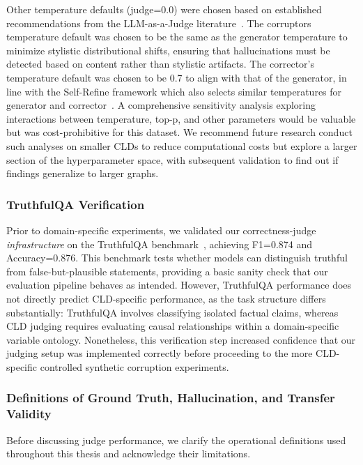 Other temperature defaults (judge=0.0) were chosen based on established recommendations from the LLM-as-a-Judge literature~\citep{liu2023gevalnlgevaluationusing, zheng2024judging}.
The corruptors temperature default was chosen to be the same as the generator temperature to minimize stylistic distributional shifts, ensuring that hallucinations must be detected based on content rather than stylistic artifacts.
The corrector's temperature default was chosen to be 0.7 to align with that of the generator, in line with the Self-Refine framework which also selects similar temperatures for generator and corrector~\citep{madaan2023selfrefineiterativerefinementselffeedback}.
A comprehensive sensitivity analysis exploring interactions between temperature, top-p, and other parameters would be valuable but was cost-prohibitive for this dataset. We recommend future research conduct such analyses on smaller CLDs to reduce computational costs but explore a larger section of the hyperparameter space, with subsequent validation to find out if findings generalize to larger graphs.

\subsubsection{TruthfulQA Verification}

Prior to domain-specific experiments, we validated our correctness-judge \textit{infrastructure} on the TruthfulQA benchmark~\citep{lin2022truthfulqa}, achieving F1=0.874 and Accuracy=0.876. This benchmark tests whether models can distinguish truthful from false-but-plausible statements, providing a basic sanity check that our evaluation pipeline behaves as intended. However, TruthfulQA performance does not directly predict CLD-specific performance, as the task structure differs substantially: TruthfulQA involves classifying isolated factual claims, whereas CLD judging requires evaluating causal relationships within a domain-specific variable ontology. Nonetheless, this verification step increased confidence that our judging setup was implemented correctly before proceeding to the more CLD-specific controlled synthetic corruption experiments.

\subsubsection{Definitions of Ground Truth, Hallucination, and Transfer Validity}

Before discussing judge performance, we clarify the operational definitions used throughout this thesis and acknowledge their limitations.

